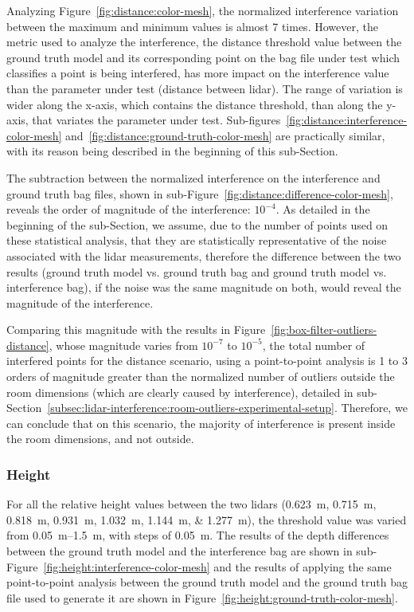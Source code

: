 Analyzing Figure~\ref{fig:distance:color-mesh}, the normalized interference variation between the maximum and minimum values is almost 7 times. However, the metric used to analyze the interference, the distance threshold value between the ground truth model and its corresponding point on the bag file under test which classifies a point is being interfered, has more impact on the interference value than the parameter under test (distance between \ac{lidar}). The range of variation is wider along the x-axis, which contains the distance threshold, than along the y-axis, that variates the parameter under test. Sub-figures~\ref{fig:distance:interference-color-mesh} and~\ref{fig:distance:ground-truth-color-mesh} are practically similar, with its reason being described in the beginning of this sub-Section.

The subtraction between the normalized interference on the interference and ground truth bag files, shown in sub-Figure~\ref{fig:distance:difference-color-mesh}, reveals the order of magnitude of the interference: $10^{-4}$. As detailed in the beginning of the sub-Section, we assume, due to the number of points used on these statistical analysis, that they are statistically representative of the noise associated with the \ac{lidar} measurements, therefore the difference between the two results (ground truth model vs. ground truth bag and ground truth model vs. interference bag), if the noise was the same magnitude on both, would reveal the magnitude of the interference. 

Comparing this magnitude with the results in Figure~\ref{fig:box-filter-outliers-distance}, whose magnitude varies from $10^{-7}$ to $10^{-5}$, the total number of interfered points for the distance scenario, using a point-to-point analysis is 1 to 3 orders of magnitude greater than the normalized number of outliers outside the room dimensions (which are clearly caused by interference), detailed in sub-Section~\ref{subsec:lidar-interference:room-outliers-experimental-setup}. Therefore, we can conclude that on this scenario, the majority of interference is present inside the room dimensions, and not outside.

\subsubsection{Height}
For all the relative height values between the two \acp{lidar} (\SIlist[list-units=single]{0.623; 0.715; 0.818; 0.931; 1.032; 1.144; 1.277}{\meter}), the threshold value was varied from \SIrange{0.05}{1.5}{\meter}, with steps of \SI{0.05}{\meter}. The results of the depth differences between the ground truth model and the interference bag are shown in sub-Figure~\ref{fig:height:interference-color-mesh} and the results of applying the same point-to-point analysis between the ground truth model and the ground truth bag file used to generate it are shown in Figure~\ref{fig:height:ground-truth-color-mesh}.

